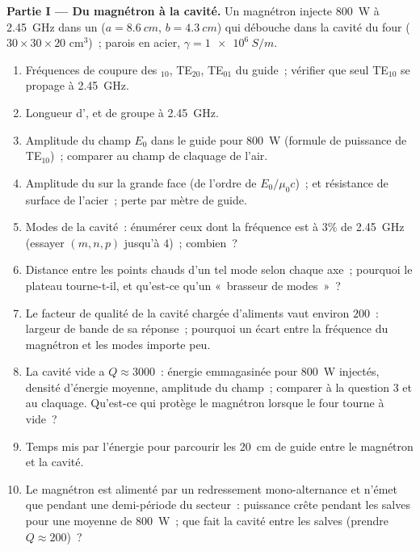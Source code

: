 \begin{problem}
\label{pb:b2:guided-waves:1}

\medskip
\noindent\textbf{Partie I --- Du magnétron à la cavité.}
Un magnétron injecte \qty{800}{W} à \qty{2.45}{GHz} dans un  ($a = \qty{8.6}{cm}$, $b = \qty{4.3}{cm}$) qui débouche dans la cavité
du four ($30 \times 30 \times 20$ cm$^3$)~; parois en acier, $\gamma = \qty{1e6}{S/m}$.
\begin{enumerate}
  \item Fréquences de coupure des $_{10}$, TE$_{20}$, TE$_{01}$ du guide~;
        vérifier que seul TE$_{10}$ se propage à \qty{2.45}{GHz}.
  \item Longueur d',  et de groupe à \qty{2.45}{GHz}.
  \item Amplitude du champ $E_0$ dans le guide pour \qty{800}{W} (formule de puissance
        de TE$_{10}$)~; comparer au champ de claquage de l'air.
  \item Amplitude du  sur la grande face (de l'ordre de
        $E_0/\mu_0c$)~;  et résistance de surface de l'acier~;
        perte par mètre de guide.
  \item Modes de la cavité~: énumérer ceux dont la fréquence est à $3\%$
        de \qty{2.45}{GHz} (essayer $(m, n, p)$ jusqu'à $4$)~; combien~?
  \item Distance entre les points chauds d'un tel mode selon chaque
        axe~; pourquoi le plateau tourne-t-il, et qu'est-ce qu'un «~brasseur de modes~»~?
  \item Le facteur de qualité de la cavité chargée d'aliments vaut environ
        $200$~: largeur de bande de sa réponse~; pourquoi un écart entre la
        fréquence du magnétron et les modes importe peu.
  \item La cavité vide a $Q \approx 3000$~: énergie emmagasinée pour \qty{800}{W}
        injectés, densité d'énergie moyenne, amplitude du champ~; comparer à la
        question 3 et au claquage. Qu'est-ce qui protège le magnétron
        lorsque le four tourne à vide~?
  \item Temps mis par l'énergie pour parcourir les \qty{20}{cm} de guide entre
        le magnétron et la cavité.
  \item Le magnétron est alimenté par un redressement mono-alternance et n'émet
        que pendant une demi-période du secteur~: puissance crête pendant
        les salves pour une moyenne de \qty{800}{W}~; que fait la cavité
        entre les salves (prendre $Q \approx 200$)~?
\end{enumerate}


\end{problem}
